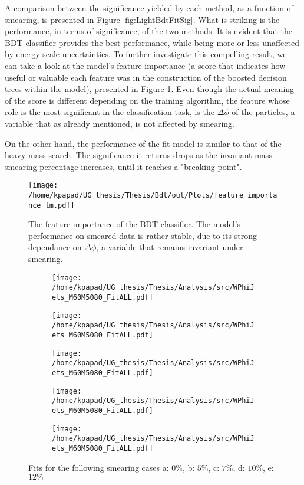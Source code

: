 A comparison between the significance yielded by each method, as a function of smearing, is presented in Figure \ref{fig:LightBdtFitSig}. What is striking is the performance, in terms of significance, of the two methods. It is evident that the BDT classifier provides the best performance, while being more or less unaffected by energy scale uncertainties. To further investigate this compelling result, we can take a look at the model's feature importance (a score that indicates how useful or valuable each feature was in the construction of the boosted decision trees within the model), presented in Figure \ref{fig:LightFeatureImportance}. Even though the actual meaning of the score is different depending on the training algorithm, the feature whose role is the most significant in the classification task, is the \(\Delta\phi\) of the particles, a variable that as already mentioned, is not affected by smearing.

On the other hand, the performance of the fit model is similar to that of the heavy mass search. The significance it returns drops as the invariant mass smearing percentage increases, until it reaches a "breaking point".
\begin{figure}[h!]
\centering
\texttt{[image: /home/kpapad/UG\_thesis/Thesis/Bdt/out/Plots/feature\_importance\_lm.pdf]}
\caption{The feature importance of the BDT classifier. The model's performance on smeared data is rather stable, due to its strong dependance on $\Delta\phi$, a variable that remains invariant under smearing. }
\label{fig:LightFeatureImportance}
\end{figure}


\begin{figure}[hp]
\centering
\begin{subfigure}{0.45\textwidth}
\centering
\texttt{[image: /home/kpapad/UG\_thesis/Thesis/Analysis/src/WPhiJets\_M60M5080\_FitALL.pdf]}
\caption{}
\end{subfigure}
\begin{subfigure}{0.45\textwidth}
\centering
\texttt{[image: /home/kpapad/UG\_thesis/Thesis/Analysis/src/WPhiJets\_M60M5080\_FitALL.pdf]}
\caption{}
\end{subfigure}

\begin{subfigure}{0.45\textwidth}
\centering
\texttt{[image: /home/kpapad/UG\_thesis/Thesis/Analysis/src/WPhiJets\_M60M5080\_FitALL.pdf]}
\caption{}
\end{subfigure}
\begin{subfigure}{0.45\textwidth}
\centering
\texttt{[image: /home/kpapad/UG\_thesis/Thesis/Analysis/src/WPhiJets\_M60M5080\_FitALL.pdf]}
\caption{}
\end{subfigure}

\begin{subfigure}{0.45\textwidth}
\centering
\texttt{[image: /home/kpapad/UG\_thesis/Thesis/Analysis/src/WPhiJets\_M60M5080\_FitALL.pdf]}
\caption{}
\end{subfigure}
\caption{Fits for the following smearing cases a: $0\%$, b: $5\%$, c: $7\%$, d: $10\%$, e: $12\%$}
\label{fig:Lightfits}
\end{figure}
